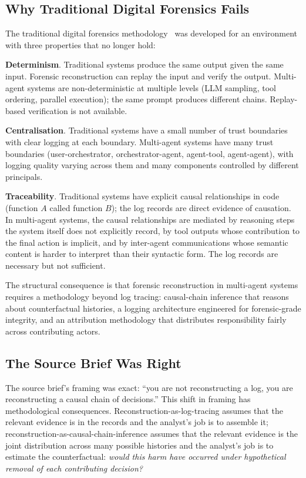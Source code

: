 \documentclass[sigconf,nonacm]{acmart}
\begin{document}
\subsection{Why Traditional Digital Forensics Fails}

The traditional digital forensics
methodology~\cite{casey2024digitalforensics,
quick2024forensicstrends} was developed for an environment with
three properties that no longer hold:

\textbf{Determinism}. Traditional systems produce the same output
given the same input. Forensic reconstruction can replay the
input and verify the output. Multi-agent systems are
non-deterministic at multiple levels (LLM sampling, tool ordering,
parallel execution); the same prompt produces different chains.
Replay-based verification is not available.

\textbf{Centralisation}. Traditional systems have a small number
of trust boundaries with clear logging at each boundary. Multi-agent
systems have many trust boundaries (user-orchestrator,
orchestrator-agent, agent-tool, agent-agent), with logging quality
varying across them and many components controlled by different
principals.

\textbf{Traceability}. Traditional systems have explicit causal
relationships in code (function $A$ called function $B$); the
log records are direct evidence of causation. In multi-agent
systems, the causal relationships are mediated by reasoning steps
the system itself does not explicitly record, by tool outputs whose
contribution to the final action is implicit, and by inter-agent
communications whose semantic content is harder to interpret than
their syntactic form. The log records are necessary but not
sufficient.

The structural consequence is that forensic reconstruction in
multi-agent systems requires a methodology beyond log tracing:
causal-chain inference that reasons about counterfactual histories,
a logging architecture engineered for forensic-grade integrity,
and an attribution methodology that distributes responsibility
fairly across contributing actors.

\subsection{The Source Brief Was Right}

The source brief's framing was exact: ``you are not reconstructing
a log, you are reconstructing a causal chain of decisions.'' This
shift in framing has methodological consequences. Reconstruction-as-log-tracing
assumes that the relevant evidence is in the records and the analyst's
job is to assemble it; reconstruction-as-causal-chain-inference
assumes that the relevant evidence is the joint distribution
across many possible histories and the analyst's job is to estimate
the counterfactual: \emph{would this harm have occurred under
hypothetical removal of each contributing decision?}
\end{document}
